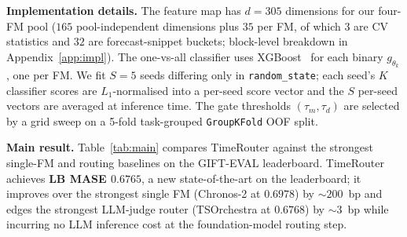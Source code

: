 \documentclass{article}
\theoremstyle{plain}
\theoremstyle{definition}
\theoremstyle{remark}
\begin{document}
\textbf{Implementation details.} The feature map has $d{=}305$ dimensions for our four-FM pool ($165$ pool-independent dimensions plus $35$ per FM, of which $3$ are CV statistics and $32$ are forecast-snippet buckets; block-level breakdown in Appendix~\ref{app:impl}). The one-vs-all classifier uses XGBoost~\citep{chen2016xgboost} for each binary $g_{\theta_k}$, one per FM. We fit $S{=}5$ seeds differing only in \texttt{random\_state}; each seed's $K$ classifier scores are $L_1$-normalised into a per-seed score vector and the $S$ per-seed vectors are averaged at inference time. The gate thresholds $(\tau_m, \tau_d)$ are selected by a grid sweep on a 5-fold task-grouped \texttt{GroupKFold} OOF split.


\textbf{Main result.} Table~\ref{tab:main} compares TimeRouter against the strongest single-FM and routing baselines on the GIFT-EVAL leaderboard. TimeRouter achieves \textbf{LB MASE $0.6765$}, a new state-of-the-art on the leaderboard; it improves over the strongest single FM (Chronos-2 at $0.6978$) by $\sim$$200$~bp and edges the strongest LLM-judge router (TSOrchestra at $0.6768$) by $\sim$$3$~bp while incurring no LLM inference cost at the foundation-model routing step.
\end{document}
